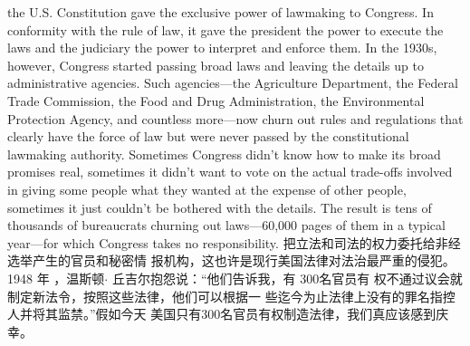 \begin{paracol}{2}
the U.S. Constitution gave the exclusive power of lawmaking to
Congress. In conformity with the rule of law, it gave the president the power to execute the laws and the judiciary the power
to interpret and enforce them. In the 1930s, however, Congress
started passing broad laws and leaving the details up to administrative agencies. Such agencies---the Agriculture Department, the Federal Trade Commission, the Food and Drug
Administration, the Environmental Protection Agency, and
countless more---now churn out rules and regulations that
clearly have the force of law but were never passed by the constitutional lawmaking authority. Sometimes Congress didn't
know how to make its broad promises real, sometimes it didn't
want to vote on the actual trade-offs involved in giving some
people what they wanted at the expense of other people, sometimes it just couldn't be bothered with the details. The result is
tens of thousands of bureaucrats churning out laws---60,000
pages of them in a typical year---for which Congress takes no
responsibility.
\switchcolumn
把立法和司法的权力委托给非经选举产生的官员和秘密情
报机构，这也许是现行美国法律对法治最严重的侵犯。1948
年 ，温斯顿$\cdot$ 丘吉尔抱怨说：“他们告诉我，有 300名官员有
权不通过议会就制定新法令，按照这些法律，他们可以根据一
些迄今为止法律上没有的罪名指控人并将其监禁。”假如今天
美国只有300名官员有权制造法律，我们真应该感到庆幸。


\end{paracol}
